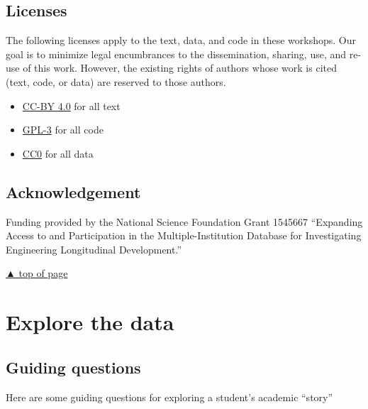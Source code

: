 \documentclass[
]{book}
\providecommand{\tightlist}{%
  \setlength{\itemsep}{0pt}\setlength{\parskip}{0pt}}
\begin{document}
\hypertarget{licenses}{%
\section{Licenses}\label{licenses}}

The following licenses apply to the text, data, and code in these workshops. Our goal is to minimize legal encumbrances to the dissemination, sharing, use, and re-use of this work. However, the existing rights of authors whose work is cited (text, code, or data) are reserved to those authors.

\begin{itemize}
\tightlist
\item
  \href{https://creativecommons.org/licenses/by/4.0/legalcode}{CC-BY 4.0} for all text\\
\item
  \href{https://www.r-project.org/Licenses/GPL-3}{GPL-3} for all code\\
\item
  \href{https://wiki.creativecommons.org/wiki/CC0_use_for_data}{CC0} for all data
\end{itemize}

\hypertarget{acknowledgement}{%
\section{Acknowledgement}\label{acknowledgement}}

Funding provided by the National Science Foundation Grant 1545667 ``Expanding Access to and Participation in the Multiple-Institution Database for Investigating Engineering Longitudinal Development.''

\protect\hyperlink{introduction}{▲ top of page}

\hypertarget{explore-the-data}{%
\chapter{Explore the data}\label{explore-the-data}}

\hypertarget{guiding-questions}{%
\section{Guiding questions}\label{guiding-questions}}

Here are some guiding questions for exploring a student's academic ``story''
\end{document}
